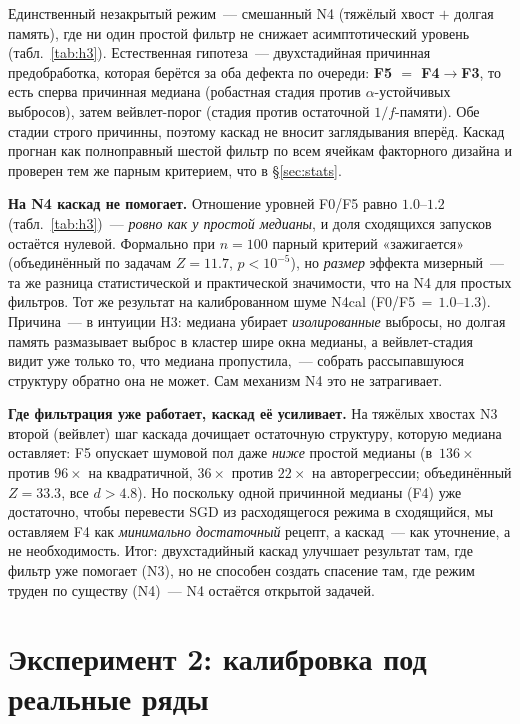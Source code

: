 \documentclass[conference]{IEEEtran}
\begin{document}
Единственный незакрытый режим~--- смешанный N4 (тяжёлый хвост $+$ долгая
память), где ни один простой фильтр не снижает асимптотический уровень
(табл.~\ref{tab:h3}). Естественная гипотеза~--- двухстадийная причинная
предобработка, которая берётся за оба дефекта по очереди: \textbf{F5 $=$ F4$\to$F3},
то есть сперва причинная медиана (робастная стадия против $\alpha$-устойчивых
выбросов), затем вейвлет-порог (стадия против остаточной $1/f$-памяти). Обе стадии строго причинны, поэтому каскад не
вносит заглядывания вперёд. Каскад прогнан как полноправный шестой фильтр по
всем ячейкам факторного дизайна и проверен тем же парным критерием, что в
§\ref{sec:stats}.

\textbf{На N4 каскад не помогает.} Отношение уровней F0/F5 равно
$1.0$--$1.2$ (табл.~\ref{tab:h3})~--- \emph{ровно как у простой медианы}, и
доля сходящихся запусков остаётся нулевой. Формально при $n=100$ парный
критерий «зажигается» (объединённый по задачам $Z=11.7$, $p<10^{-5}$), но
\emph{размер} эффекта мизерный~--- та же разница статистической и
практической значимости, что на N4 для простых фильтров. Тот же результат на
калиброванном шуме N4cal (F0/F5${\,=\,}1.0$--$1.3$). Причина~--- в интуиции
H3: медиана убирает \emph{изолированные} выбросы, но долгая память
размазывает выброс в кластер шире окна медианы, а вейвлет-стадия видит уже
только то, что медиана пропустила,~--- собрать рассыпавшуюся структуру
обратно она не может. Сам механизм N4 это не затрагивает.

\textbf{Где фильтрация уже работает, каскад её усиливает.} На тяжёлых хвостах
N3 второй (вейвлет) шаг каскада дочищает остаточную структуру, которую
медиана оставляет: F5 опускает шумовой пол даже \emph{ниже} простой медианы
(в~$136\times$ против $96\times$ на квадратичной, $36\times$ против
$22\times$ на авторегрессии; объединённый $Z=33.3$, все $d>4.8$). Но
поскольку одной причинной медианы (F4) уже достаточно, чтобы перевести SGD
из расходящегося режима в сходящийся, мы оставляем F4 как
\emph{минимально достаточный} рецепт, а каскад~--- как уточнение, а не
необходимость. Итог: двухстадийный каскад улучшает результат там, где фильтр
уже помогает (N3), но не способен создать спасение там, где режим труден по
существу (N4)~--- N4 остаётся открытой задачей.

\section{Эксперимент 2: калибровка под реальные ряды}
\label{sec:exp2}
\end{document}
